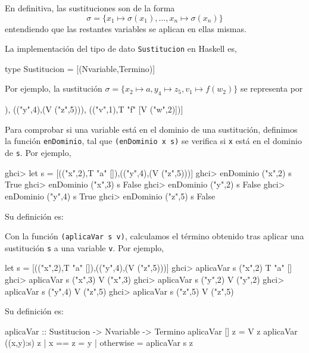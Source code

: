 En definitiva, las sustituciones son de la forma
$$\sigma = \{ x_1 \mapsto \sigma(x_1), \dots, x_n \mapsto \sigma(x_n)\}$$ 
entendiendo que las restantes variables se aplican en ellas mismas.

La implementación del tipo de dato \texttt{Sustitucion} en Haskell es,

\begin{codigo}
  type Sustitucion = [(Nvariable,Termino)]
\end{codigo}

Por ejemplo, la sustitución
$\sigma = \{ x_2 \mapsto a, y_4 \mapsto z_5, v_1 \mapsto f(w_2) \}$ 
se representa por 
\begin{sesion}
[(("x",2),T "a" []),
 (("y",4),(V ("z",5))),
 (("v",1),T "f" [V ("w",2)])]
\end{sesion}

Para comprobar si una variable está en el dominio de una sustitución, definimos
la función \texttt{enDominio}, tal que \texttt{(enDominio x s)} se verifica si
\texttt{x} está en el dominio de \texttt{s}. Por ejemplo,

\begin{sesion}
ghci> let s = [(("x",2),T "a" []),(("y",4),(V ("z",5)))]
ghci> enDominio ("x",2) s
True
ghci> enDominio ("x",3) s
False
ghci> enDominio ("y",2) s
False
ghci> enDominio ("y",4) s
True
ghci> enDominio ("z",5) s
False
\end{sesion}

Su definición es:


Con la función \texttt{(aplicaVar s v)}, calculamos el término
obtenido tras aplicar una sustitución \texttt{s} a una variable
\texttt{v}. Por ejemplo,

\begin{sesion}
let s = [(("x",2),T "a" []),(("y",4),(V ("z",5)))]
ghci> aplicaVar s ("x",2)
T "a" []
ghci> aplicaVar s ("x",3)
V ("x",3)
ghci> aplicaVar s ("y",2)
V ("y",2)
ghci> aplicaVar s ("y",4)
V ("z",5)
ghci> aplicaVar s ("z",5)
V ("z",5)
\end{sesion}

Su definición es:

\begin{codigo}
aplicaVar :: Sustitucion -> Nvariable -> Termino 
aplicaVar [] z = V z 
aplicaVar ((x,y):s) z 
  | x == z    = y
  | otherwise = aplicaVar s z
\end{codigo}

